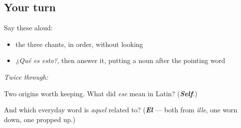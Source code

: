 \subsection*{Your turn}
Say these aloud:

\begin{itemize}
\raggedright
  \item the three chants, in order, without looking
  \item \emph{¿Qué es esto?}, then answer it, putting a noun after the pointing word
\end{itemize}

\emph{Twice through:}

\begin{tcolorbox}[breakable,colback=teal!4,colframe=teal!35!black,title={Before you move on}]
Two origins worth keeping. What did \emph{ese} mean in Latin? (\emph{\textbf{Self}}.)

And which everyday word is \emph{aquel} related to? (\emph{\textbf{El}} — both from \emph{ille}, one worn down, one propped up.)
\end{tcolorbox}

